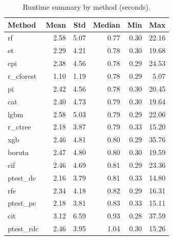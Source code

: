 \begin{table}[h]
\centering
\caption{Runtime summary by method (seconds).}
\label{tab:runtime}
\begin{tabular}{lrrrrr}
\toprule
Method & Mean & Std & Median & Min & Max \\
\midrule
rf & 2.58 & 5.07 & 0.77 & 0.30 & 22.16 \\
et & 2.29 & 4.21 & 0.78 & 0.30 & 19.68 \\
cpi & 2.38 & 4.56 & 0.78 & 0.29 & 24.53 \\
r_cforest & 1.10 & 1.19 & 0.78 & 0.29 & 5.07 \\
pi & 2.42 & 4.56 & 0.78 & 0.30 & 20.45 \\
cat & 2.40 & 4.73 & 0.79 & 0.30 & 19.64 \\
lgbm & 2.58 & 5.03 & 0.79 & 0.29 & 22.06 \\
r_ctree & 2.18 & 3.87 & 0.79 & 0.33 & 15.20 \\
xgb & 2.46 & 4.81 & 0.80 & 0.29 & 35.76 \\
boruta & 2.47 & 4.80 & 0.80 & 0.30 & 19.59 \\
cif & 2.46 & 4.69 & 0.81 & 0.29 & 23.36 \\
ptest_dc & 2.16 & 3.79 & 0.81 & 0.33 & 14.80 \\
rfe & 2.34 & 4.18 & 0.82 & 0.29 & 16.31 \\
ptest_pc & 2.18 & 3.81 & 0.83 & 0.33 & 15.11 \\
cit & 3.12 & 6.59 & 0.93 & 0.28 & 37.59 \\
ptest_rdc & 2.46 & 3.95 & 1.04 & 0.30 & 15.26 \\
\bottomrule
\end{tabular}
\end{table}